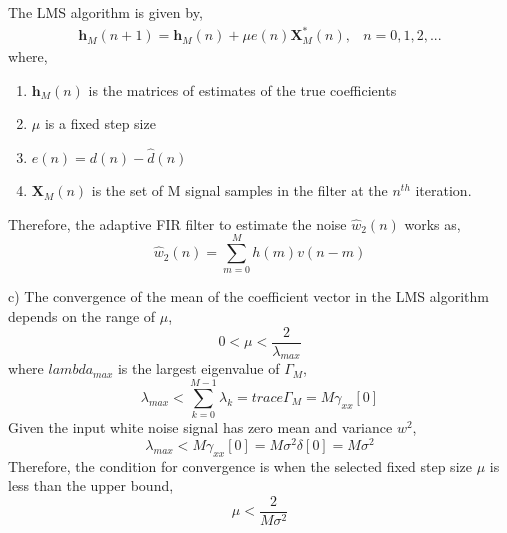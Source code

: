 \documentclass[12pt]{article}
\begin{document}
The LMS algorithm is given by,
\begin{equation}
\begin{array}{lr}
		\bm{h}_{M}(n+1)=\bm{h}_{M}(n)+\mu e(n)\bm{X}_{M}^{*}(n), & n=0,1,2,...
\end{array}
\end{equation}
where, 
\begin{enumerate}
	\item $\mathbf{h}_{M}(n)$ is the matrices of estimates of the true coefficients
	\item $\mu$ is a fixed step size
	\item $e(n)=d(n)-\hat{d}(n)$
	\item $\bm{X}_{M}(n)$ is the set of M signal samples in the filter at the $n^{th}$ iteration.
\end{enumerate}
Therefore, the adaptive FIR filter to estimate the noise $\hat{w}_{2}(n)$ works as,
\begin{equation}
	\hat{w}_{2}(n)=\sum_{m=0}^{M}{h(m)v(n-m)}
\end{equation}

\noindent
c)
The convergence of the mean of the coefficient vector in the LMS algorithm depends on the range of $\mu$,
\begin{equation}
	0<\mu<\frac{2}{\lambda_{max}}
\end{equation}
where $lambda_{max}$ is the largest eigenvalue of $\Gamma_{M}$,
\begin{equation}
	\lambda_{max}<\sum_{k=0}^{M-1}{\lambda_{k}}=trace\Gamma_{M}=M\gamma_{xx}[0]
\end{equation}
Given the input white noise signal has zero mean and variance $w^{2}$, 
\begin{equation}
	\lambda_{max}<M\gamma_{xx}[0]=M\sigma^{2}\delta[0]=M\sigma^{2}
\end{equation}
Therefore, the condition for convergence is when the selected fixed step size $\mu$ is less than the upper bound,
\begin{equation}
	\mu<\frac{2}{M\sigma^{2}}
\end{equation}
\end{document}

